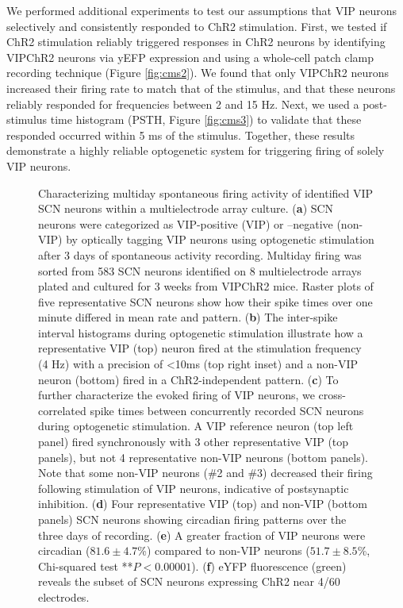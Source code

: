 We performed additional experiments to test our assumptions that VIP neurons selectively and consistently responded to ChR2 stimulation.
First, we tested if ChR2 stimulation reliably triggered responses in ChR2 neurons by identifying VIPChR2 neurons via yEFP expression and using a whole-cell patch clamp recording technique (Figure \ref{fig:cms2}).
We found that only VIPChR2 neurons increased their firing rate to match that of the stimulus, and that these neurons reliably responded for frequencies between 2 and 15 Hz.
Next, we used a post-stimulus time histogram (PSTH, Figure \ref{fig:cms3}) to validate that these responded occurred within 5 ms of the stimulus.
Together, these results demonstrate a highly reliable optogenetic system for triggering firing of solely VIP neurons.
\begin{figure}[!p]
    \caption{\label{fig:cm1} 
    Characterizing multiday spontaneous firing activity of identified VIP SCN neurons within a multielectrode array culture.
    (\textbf{a}) SCN neurons were categorized as VIP-positive (VIP) or –negative (non-VIP) by optically tagging VIP neurons using optogenetic stimulation after 3 days of spontaneous activity recording.  Multiday firing was sorted from 583 SCN neurons identified on 8 multielectrode arrays plated and cultured for 3 weeks from VIPChR2 mice. Raster plots of five representative SCN neurons show how their spike times over one minute differed in mean rate and pattern. 
    (\textbf{b}) The inter-spike interval histograms during optogenetic stimulation illustrate how a representative VIP (top) neuron fired at the stimulation frequency (4 Hz) with a precision of <10ms (top right inset) and a non-VIP neuron (bottom) fired in a ChR2-independent pattern. 
    (\textbf{c}) To further characterize the evoked firing of VIP neurons, we cross-correlated spike times between concurrently recorded SCN neurons during optogenetic stimulation. A VIP reference neuron (top left panel) fired synchronously with 3 other representative VIP (top panels), but not 4 representative non-VIP neurons (bottom panels). Note that some non-VIP neurons (\#2 and \#3) decreased their firing following stimulation of VIP neurons, indicative of postsynaptic inhibition. 
    (\textbf{d}) Four representative VIP (top) and non-VIP (bottom panels) SCN neurons showing circadian firing patterns over the three days of recording. 
    (\textbf{e}) A greater fraction of VIP neurons were circadian ($81.6 \pm 4.7$\%) compared to non-VIP neurons ($51.7 \pm 8.5$\%, Chi-squared test **$P< 0.00001$). 
    (\textbf{f}) eYFP fluorescence (green) reveals the subset of SCN neurons expressing ChR2 near 4/60 electrodes.
    }
\end{figure}
